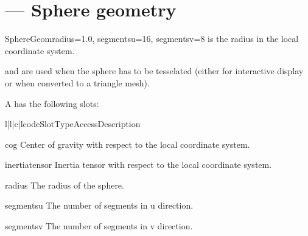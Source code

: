 
\section{ ---
         Sphere geometry}

\begin{classdesc}{SphereGeom}{radius=1.0, segmentsu=16, segmentsv=8}
 is the radius in the local coordinate system.

 and  are used when the sphere has to
be tesselated (either for interactive display or when converted to
a triangle mesh).
\end{classdesc}

A  has the following slots:

\begin{tableiv}{l|l|c|l}{code}{Slot}{Type}{Access}{Description}
\end{tableiv}

\begin{memberdesc}{cog}
Center of gravity with respect to the local coordinate system.
\end{memberdesc}

\begin{memberdesc}{inertiatensor}
Inertia tensor with respect to the local coordinate system.
\end{memberdesc}

\begin{memberdesc}{radius}
The radius of the sphere.
\end{memberdesc}

\begin{memberdesc}{segmentsu}
The number of segments in u direction.
\end{memberdesc}

\begin{memberdesc}{segmentsv}
The number of segments in v direction.
\end{memberdesc}






